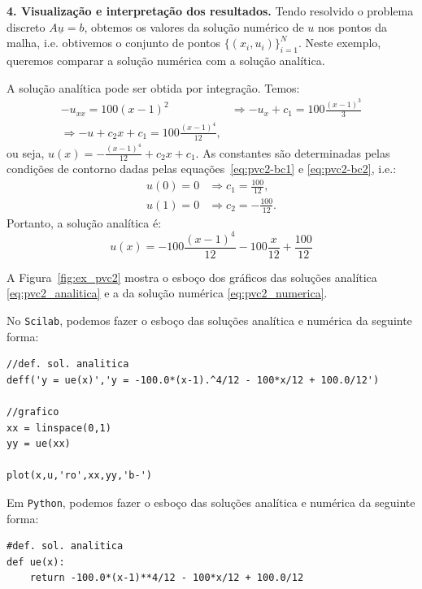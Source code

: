 \begin{sol}
{\bf 4. Visualização e interpretação dos resultados.} Tendo resolvido o problema discreto $A\underline{u} = b$, obtemos os valores da solução numérico de $u$ nos pontos da malha, i.e. obtivemos o conjunto de pontos $\{(x_i, u_i)\}_{i=1}^N$. Neste exemplo, queremos comparar a solução numérica com a solução analítica.

A solução analítica pode ser obtida por integração. Temos:
\begin{equation*}
  \begin{split}
    -u_{xx} = 100(x-1)^2 &\Rightarrow -u_x + c_1 = 100\frac{(x-1)^3}{3}\\
    \Rightarrow -u + c_2x + c_1 = 100\frac{(x-1)^4}{12},
  \end{split}
\end{equation*}
ou seja, $\displaystyle u(x) = - \frac{(x-1)^4}{12} + c_2x + c_1$. As constantes são determinadas pelas condições de contorno dadas pelas equações~\eqref{eq:pvc2-bc1} e \eqref{eq:pvc2-bc2}, i.e.:
\begin{equation*}
  \begin{split}
    u(0) = 0 &\Rightarrow c_1 = \frac{100}{12},\\
    u(1) = 0 &\Rightarrow c_2 = -\frac{100}{12}.
  \end{split}
\end{equation*}
Portanto, a solução analítica é:
\begin{equation}\label{eq:pvc2_analitica}
  u(x) = -100\frac{(x-1)^4}{12} - 100\frac{x}{12} + \frac{100}{12}
\end{equation}

A Figura~\ref{fig:ex_pvc2} mostra o esboço dos gráficos das soluções analítica \eqref{eq:pvc2_analitica} e a da solução numérica \eqref{eq:pvc2_numerica}.

\ifisscilab
No \verb+Scilab+, podemos fazer o esboço das soluções analítica e numérica da seguinte forma:
\begin{verbatim}
//def. sol. analitica
deff('y = ue(x)','y = -100.0*(x-1).^4/12 - 100*x/12 + 100.0/12')

//grafico
xx = linspace(0,1)
yy = ue(xx)

plot(x,u,'ro',xx,yy,'b-')
\end{verbatim}
\fi
\ifispython
Em \verb+Python+, podemos fazer o esboço das soluções analítica e numérica da seguinte forma:
\begin{verbatim}
#def. sol. analitica
def ue(x):
    return -100.0*(x-1)**4/12 - 100*x/12 + 100.0/12


\end{verbatim}
\end{sol}
